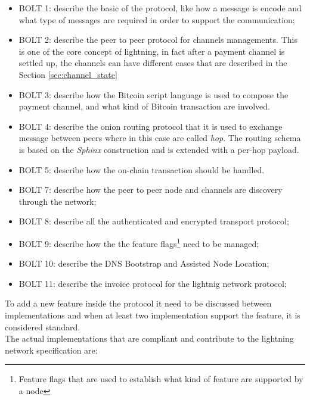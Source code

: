 \begin{itemize}
  \item BOLT 1: describe the basic of the protocol, like how a message is encode and what type of messages are required in order to support the communication;
  \item BOLT 2: describe the peer to peer protocol for channels managements. This is one of the core concept of lightning, in fact after a payment channel
        is settled up, the channels can have different cases that are described in the Section \ref{sec:channel_state}
  \item BOLT 3: describe how the Bitcoin script language is used to compose the
        payment channel, and what kind of Bitcoin transaction are involved.
  \item BOLT 4: describe the onion routing protocol that it is used to exchange message between peers where in this case are called \emph{hop}.
        The routing schema is based on the \emph{Sphinx}\cite{sphinx} construction and is extended with a per-hop payload.
  \item BOLT 5: describe how the on-chain transaction should be handled.
  \item BOLT 7: describe how the peer to peer node and channels are discovery through the network;
  \item BOLT 8: describe all the authenticated and encrypted transport protocol;
  \item BOLT 9: describe how the the feature flags\footnote{Feature flags that are used to establish what kind of feature are supported by a node} need to be managed;
  \item BOLT 10: describe the DNS Bootstrap and Assisted Node Location;
  \item BOLT 11: describe the invoice protocol for the lightnig network protocol;
\end{itemize}

To add a new feature inside the protocol it need to be discussed between implementations and when at least two implementation support the feature, it is considered standard.\\
The actual implementations that are compliant and contribute to the lightning network specification are:

